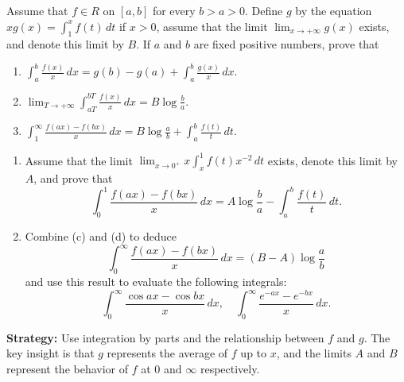\begin{problembox}
Assume that $f \in R$ on $[a, b]$ for every $b > a > 0$. Define $g$ by the equation $xg(x) = \int_{1}^{x} f(t) \, dt$ if $x > 0$, assume that the limit $\lim_{x \to +\infty} g(x)$ exists, and denote this limit by $B$. If $a$ and $b$ are fixed positive numbers, prove that
\begin{enumerate}[label=(\alph*)]
\item $\int_{a}^{b} \frac{f(x)}{x} \, dx = g(b) - g(a) + \int_{a}^{b} \frac{g(x)}{x} \, dx.$
\item $\lim_{T \to +\infty} \int_{aT}^{bT} \frac{f(x)}{x} \, dx = B \log \frac{b}{a}.$
\item $\int_{1}^{\infty} \frac{f(ax) - f(bx)}{x} \, dx = B \log \frac{a}{b} + \int_{a}^{b} \frac{f(t)}{t} \, dt.$
\end{enumerate}
\begin{enumerate}[label=(\alph*),resume]
\item Assume that the limit $\lim_{x \to 0^+} x \int_{x}^{1} f(t)x^{-2} \, dt$ exists, denote this limit by $A$, and prove that
\[\int_{0}^{1} \frac{f(ax) - f(bx)}{x} \, dx = A \log \frac{b}{a} - \int_{a}^{b} \frac{f(t)}{t} \, dt.\]
\item Combine (c) and (d) to deduce
\[\int_{0}^{\infty} \frac{f(ax) - f(bx)}{x} \, dx = (B - A) \log \frac{a}{b}\]
and use this result to evaluate the following integrals:
\[\int_{0}^{\infty} \frac{\cos ax - \cos bx}{x} \, dx, \quad \int_{0}^{\infty} \frac{e^{-ax} - e^{-bx}}{x} \, dx.\]
\end{enumerate}
\end{problembox}

\noindent\textbf{Strategy:} Use integration by parts and the relationship between $f$ and $g$. The key insight is that $g$ represents the average of $f$ up to $x$, and the limits $A$ and $B$ represent the behavior of $f$ at $0$ and $\infty$ respectively.

